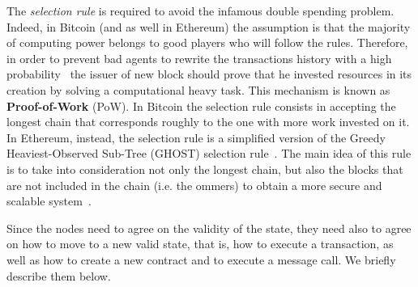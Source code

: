The \emph{selection rule} is required to avoid the infamous double spending
problem. Indeed, in Bitcoin (and as well in Ethereum) the assumption is that the
majority of computing power belongs to good players who will follow the
rules. Therefore, in order to prevent bad agents
to rewrite the transactions history with a high probability~\cite{bib:bitcoin}
the issuer of new block should prove that he invested resources in its creation
by solving a computational heavy task. This mechanism is known as
\textbf{Proof-of-Work} (PoW). In Bitcoin the selection rule consists in
accepting the longest chain that corresponds roughly to the one with more work
invested on it. In Ethereum, instead, the selection rule is a simplified version
of the Greedy Heaviest-Observed Sub-Tree (GHOST) selection
rule~\cite{wood2018ethereum}. The main idea of this rule is to take into
consideration not only the longest chain, but also the blocks that are not
included in the chain (i.e. the ommers) to obtain a more secure and scalable
system~\cite{bib:ghost}.

Since the nodes need to agree on the validity of the state, they need also to
agree on how to move to a new valid state, that is, how to execute a
transaction, as well as how to create a new contract and to execute a message
call. We briefly describe them below.


